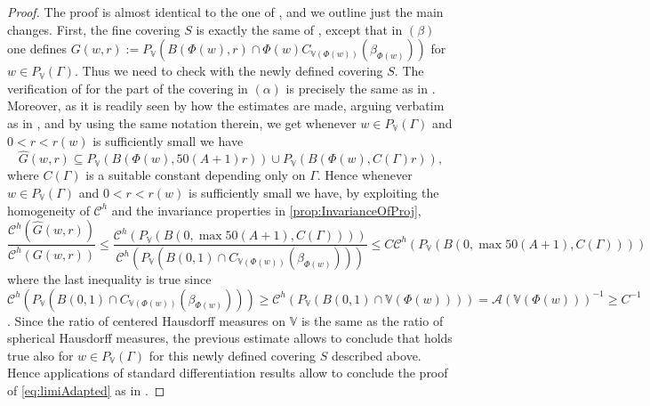 \documentclass[10pt, a4paper,
oneside, headinclude,footinclude]{scrartcl}
\begin{document}
\begin{proof}
The proof is almost identical to the one of \cite[Proposition 4.10]{antonelli2020rectifiable}, and we outline just the main changes. First, the fine covering $S$ is exactly the same of \cite[Proposition 4.10]{antonelli2020rectifiable}, except that in $(\beta)$ one defines $G(w,r):=P_\mathbb{V}(B(\Phi(w),r)\cap \Phi(w)C_{\mathbb V(\Phi(w))}(\beta_{\Phi(w)}))$ for $w\in P_{\mathbb V}(\Gamma)$. Thus we need to check \cite[Equation (84)]{antonelli2020rectifiable} with the newly defined covering $S$. The verification of \cite[Equation (84)]{antonelli2020rectifiable} for the part of the covering in $(\alpha)$ is precisely the same as in \cite{antonelli2020rectifiable}. Moreover, as it is readily seen by how the estimates are made, arguing verbatim as in \cite{antonelli2020rectifiable}, and by using the same notation therein, we get whenever $w\in P_{\mathbb V}(\Gamma)$ and $0<r<r(w)$ is sufficiently small we have
$$
\hat{G}(w,r)\subseteq P_\mathbb{V}(B(\Phi(w),50(A+1)r)) \cup P_\mathbb{V}(B(\Phi(w), C(\Gamma)r)),
$$
where $C(\Gamma)$ is a suitable constant depending only on $\Gamma$.
Hence whenever $w\in P_{\mathbb V}(\Gamma)$ and $0<r<r(w)$ is sufficiently small we have, by exploiting the homogeneity of $\mathcal{C}^h$ and the invariance properties in \cref{prop:InvarianceOfProj},
$$
\frac{\mathcal{C}^h(\hat{G}(w,r))}{\mathcal{C}^h(G(w,r))}\leq \frac{\mathcal{C}^h(P_{\mathbb V}(B(0,\max{50(A+1),C(\Gamma)})))}{\mathcal{C}^h(P_\mathbb V(B(0,1)\cap C_{\mathbb V(\Phi(w))}(\beta_{\Phi(w)})))}\leq C\mathcal{C}^h(P_{\mathbb V}(B(0,\max{50(A+1),C(\Gamma)})))
$$
where the last inequality is true since $\mathcal{C}^h(P_\mathbb V(B(0,1)\cap C_{\mathbb V(\Phi(w))}(\beta_{\Phi(w)})))\geq \mathcal{C}^h(P_{\mathbb V}(B(0,1)\cap \mathbb V(\Phi(w))))=\mathcal{A}(\mathbb V(\Phi(w)))^{-1}\geq C^{-1}$. Since the ratio of centered Hausdorff measures on $\mathbb V$ is the same as the ratio of spherical Hausdorff measures, the previous estimate allows to conclude that \cite[Equation (84)]{antonelli2020rectifiable} holds true also for $w\in P_{\mathbb V}(\Gamma)$ for this newly defined covering $S$ described above. Hence applications of standard differentiation results allow to conclude the proof of \eqref{eq:limiAdapted} as in \cite{antonelli2020rectifiable}.
\end{proof}
\end{document}
